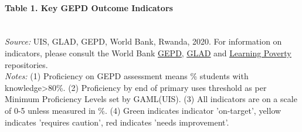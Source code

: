 \documentclass[twocolumn]{article}
\let\oldparagraph\paragraph
\renewcommand{\paragraph}[1]{\oldparagraph{#1}\mbox{}}
\begin{document}
\setlength\dashlinedash{0.2pt}
\setlength\dashlinegap{1.5pt}
\setlength\arrayrulewidth{0.3pt}

\hypertarget{table-1.-key-gepd-outcome-indicators}{%
\paragraph{Table 1. Key GEPD Outcome
Indicators}\label{table-1.-key-gepd-outcome-indicators}}

\begin{table}[H]
\\
\color{darkgray}\scriptsize{\textit{Source:} UIS, GLAD, GEPD, World Bank, Rwanda, 2020. For information on indicators, please consult the World Bank \href{https://github.com/worldbank/GEPD}{\underline{GEPD}}, \href{https://github.com/worldbank/GLAD}{\underline{GLAD}} and \href{https://github.com/worldbank/LearningPoverty}{\underline{Learning Poverty}} repositories.}\\
\color{darkgray}\scriptsize{\textit{Notes:} (1) Proficiency on GEPD assessment means \% students with knowledge\textgreater{80\%}. (2) Proficiency by end of primary uses threshold as per Minimum Proficiency Levels set by GAML(UIS). (3) All indicators are on a scale of 0-5 unless measured in \%. (4) Green indicates indicator 'on-target', yellow indicates 'requires caution', red indicates 'needs improvement'.}
\end{table}
\raggedbottom
\end{document}
